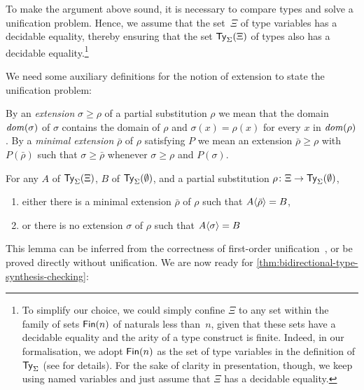 \begin{remark}
To make the argument above sound, it is necessary to compare types and solve a unification problem.
Hence, we assume that the set~$\Xi$ of type variables has a decidable equality, thereby ensuring that the set $\mathsf{Ty}_{\Sigma}(\Xi)$ of types also has a decidable equality.\footnote{%
To simplify our choice, we could simply confine $\Xi$ to any set within the family of sets $\mathsf{Fin}(n)$ of naturals less than~$n$, given that these sets have a decidable equality and the arity of a type construct is finite.
Indeed, in our formalisation, we adopt $\mathsf{Fin}(n)$ as the set of type variables in the definition of $\mathsf{Ty}_{\Sigma}$ (see  for details).
For the sake of clarity in presentation, though, we keep using named variables and just assume that $\Xi$ has a decidable equality.}
\end{remark}
We need some auxiliary definitions for the notion of extension to state the unification problem:
\begin{defn}
By an \emph{extension}\/ $\sigma \geq \rho$ of a partial substitution $\rho$ we mean that the domain $\mathit{dom}(\sigma)$ of $\sigma$ contains the domain of $\rho$ and $\sigma(x) = \rho(x)$ for every\/ $x$ in $\mathit{dom}(\rho)$.
  By a \emph{minimal extension}\/ $\bar{\rho}$ of $\rho$ satisfying $P$ we mean an extension $\bar{\rho} \geq \rho$ with $P(\bar{\rho})$ such that $\sigma \geq \bar{\rho}$ whenever $\sigma \geq \rho$ and $P(\sigma)$.
\end{defn}
\begin{lemma}\label{lem:unify}
  For any\/ $A$ of\/ $\mathsf{Ty}_{\Sigma}(\Xi)$, $B$ of\/ $\mathsf{Ty}_{\Sigma}(\emptyset)$, and a partial substitution\/ $\rho \colon \Xi \to \mathsf{Ty}_{\Sigma}(\emptyset)$, 
  \begin{enumerate}
    \item either there is a minimal extension\/ $\bar{\rho}$ of\/ $\rho$ such that\/ ${A}\!\left<{\bar{\rho}}\right> = B$,
    \item or there is no extension\/ $\sigma$ of\/ $\rho$ such that\/ ${A}\!\left<{\sigma}\right> = B$
  \end{enumerate}
\end{lemma}
This lemma can be inferred from the correctness of first-order unification~\citep{McBride2003,McBride2003a}, or be proved directly without unification.
We are now ready for \cref{thm:bidirectional-type-synthesis-checking}:

